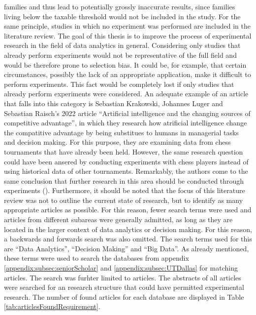 families and thus lead to potentially grossly inaccurate results, since families living below the taxable threshold would not be included in the study. For the same principle, studies in which no experiment was performed are included in the literature review. The goal of this thesis is to improve the process of experimental research in the field of data analytics in general. Considering only studies that already perform experiments would not be representative of the full field and would be therefore prone to selection bias. It could be, for example, that certain circumstances, possibly the lack of an appropriate application, make it difficult to perform experiments. This fact would be completely lost if only studies that already perform experiments were considered. An adequate example of an article that falls into this category is Sebastian Krakowski, Johannes Luger and Sebastian Raisch's 2022 article \enquote{Artificial intelligence and the changing sources of competitive advantage}, in which they research how atrificial intelligence change the compatitive advantage by being substitues to humans in managerial tasks and decision making. For this purpose, they are examining data from chess tournaments that have already been held. However, the same research question could have been ansered by conducting experiments with chess players instead of using historical data of other tournaments. Remarkably, the authors come to the same conclusion that further research in this area should be conducted through experiments (\cite{Krakowski.2022}). Furthermore, it should be noted that the focus of this literature review was not to outline the current state of research, but to identify as many appropriate articles as possible. For this reason, fewer search terms were used and articles from different subareas were generally admitted, as long as they are located in the larger context of data analytics or decision making. For this reason, a backwards and forwards search was also omitted.
The search terms used for this are \enquote{Data Analytics}, \enquote{Decision Making} and \enquote{Big Data}. As already mentioned, these terms were used to search the databases from appendix \ref{appendix:subsec:seniorScholar} and \ref{appendix:subsec:UTDallas} for matching articles. The search was furhter limited to articles. The abstracts of all articles were searched for an research structure that could have permitted experimental research. The number of found articles for each database are displayed in Table \ref{tab:articlesFoundRequirement}.

